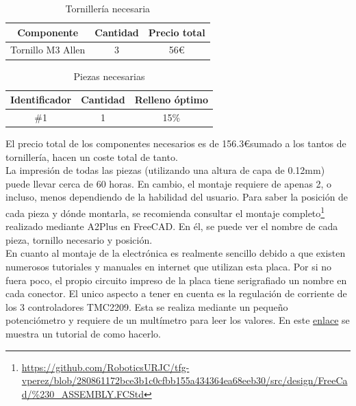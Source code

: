 \begin{table}[H]
\begin{center}
\begin{tabular}{|c|c|c|}
\hline
\textbf{Componente} & \textbf{Cantidad} & \textbf{Precio total} \\
\hline
Tornillo M3 Allen & 3 & 56\euro \\

\hline
\end{tabular}
\caption{Tornillería necesaria}
\label{cuadro:tornilleria}
\end{center}
\end{table}


\begin{table}[H]
\begin{center}
\begin{tabular}{|c|c|c|}
\hline
\textbf{Identificador} & \textbf{Cantidad} & \textbf{Relleno óptimo} \\
\hline
\#1 & 1 & 15\% \\
\hline
\end{tabular}
\caption{Piezas necesarias}
\label{cuadro:piezas}
\end{center}
\end{table}

El precio total de los componentes necesarios es de 156.3\euro sumado a los tantos de tornillería, hacen un coste total de tanto.\\

La impresión de todas las piezas (utilizando una altura de capa de 0.12mm) puede llevar cerca de 60 horas. En cambio, 
el montaje requiere de apenas 2, o incluso, menos dependiendo de la habilidad del usuario. Para saber la posición de cada pieza 
y dónde montarla, se recomienda consultar el montaje 
completo\footnote{\url{https://github.com/RoboticsURJC/tfg-vperez/blob/280861172bce3b1c0cfbb155a434364ea68eeb30/src/design/FreeCad/\%230\_ASSEMBLY.FCStd}} 
realizado mediante A2Plus en FreeCAD. En él, se puede ver 
el nombre de cada pieza, tornillo necesario y posición.
\\

En cuanto al montaje de la electrónica es realmente sencillo debido a que existen numerosos tutoriales 
y manuales en internet que utilizan esta placa. Por si no fuera poco, el propio circuito impreso de la 
placa tiene serigrafiado un nombre en cada conector. El unico aspecto a tener en cuenta es la regulación 
de corriente de los 3 controladores TMC2209. Esta se realiza mediante un pequeño potenciómetro y requiere 
de un multímetro para leer los valores. En este \href{https://all3dp.com/2/vref-calculator-tmc2209-tmc2208-a4988/}{enlace} se muestra un tutorial de como hacerlo.